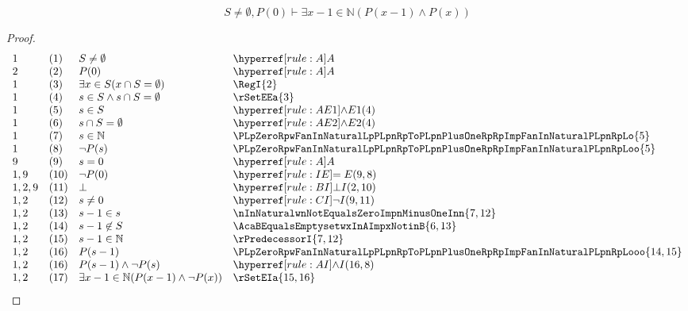 \documentclass[main.tex]{subfiles}
\begin{document}
\label{PLpZeroRpwFanInNaturalLpPLpnRpToPLpnPlusOneRpRpImpFanInNaturalPLpnRpLooooo}
\begin{lemma}[5]
\[S\neq\emptyset, P(0) \vdash \exists x-1\in \mathbb{N} (P(x-1)\land P(x))\]
\end{lemma}
\begin{proof}
	\[
	\begin{array}{llll}
		1 &  (1) & S\neq\emptyset & \rA \\
		2 &  (2) & P(0) & \rA \\	
		1 &  (3) & \exists x\in S(x\cap S=\emptyset) & \RegI{2} \\	
		1 & (4) & s\in S\land s\cap S=\emptyset & \rSetEEa{3} \\
		1 & (5) & s\in S & \rAEa{4} \\
		1 & (6) & s\cap S=\emptyset & \rAEb{4} \\
		1 & (7) & s\in\mathbb{N} & \PLpZeroRpwFanInNaturalLpPLpnRpToPLpnPlusOneRpRpImpFanInNaturalPLpnRpLo{5} \\
		1 & (8) & \neg P(s) & \PLpZeroRpwFanInNaturalLpPLpnRpToPLpnPlusOneRpRpImpFanInNaturalPLpnRpLoo{5} \\
            9 & (9) & s=0 & \rA \\
            1,9 & (10) & \neg P(0) & \rIE{9,8} \\
		1,2,9 & (11) & \bot & \rBI{2,10} \\
		1,2 & (12) & s\neq 0 & \rCI{9,11} \\
            1,2 & (13) & s-1\in s & \nInNaturalwnNotEqualsZeroImpnMinusOneInn{7,12}  \\
            1,2 & (14) & s-1\not\in S & \AcaBEqualsEmptysetwxInAImpxNotinB{6,13}  \\
            1,2 & (15) & s-1\in \mathbb{N} & \rPredecessorI{7,12}  \\
            1,2 & (16) & P(s-1)& \PLpZeroRpwFanInNaturalLpPLpnRpToPLpnPlusOneRpRpImpFanInNaturalPLpnRpLooo{14,15}  \\
            1,2 & (16) & P(s-1)\land \neg P(s)& \rAI{16,8}  \\
            1,2 & (17) & \exists x-1\in\mathbb{N} (P(x-1)\land \neg P(x))& \rSetEIa{15,16}  \\           
	\end{array}
	\]
\end{proof}
\label{PLpZeroRpwFanInNaturalLpPLpnRpToPLpnPlusOneRpRpImpFanInNaturalPLpnRp}
\begin{theorem}
\end{theorem}
\end{document}
